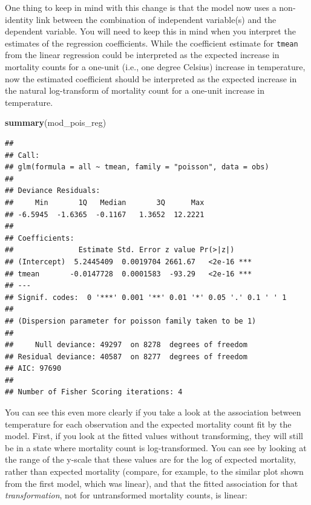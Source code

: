 \documentclass[
]{book}
\newenvironment{Shaded}{\begin{snugshade}}{\end{snugshade}}
\newcommand{\KeywordTok}[1]{\textcolor[rgb]{0.13,0.29,0.53}{\textbf{#1}}}
\newcommand{\NormalTok}[1]{#1}
\begin{document}
One thing to keep in mind with this change is that the model now uses a
non-identity link between the combination of independent variable(s) and the
dependent variable. You will need to keep this in mind when you interpret
the estimates of the regression coefficients. While the coefficient estimate
for \texttt{tmean} from the linear regression could be interpreted as the expected
increase in mortality counts for a one-unit (i.e., one degree Celsius) increase
in temperature, now the estimated coefficient should be interpreted as the
expected increase in the natural log-transform of mortality count for a one-unit
increase in temperature.

\begin{Shaded}
\begin{Highlighting}[]
\KeywordTok{summary}\NormalTok{(mod_pois_reg)}
\end{Highlighting}
\end{Shaded}

\begin{verbatim}
## 
## Call:
## glm(formula = all ~ tmean, family = "poisson", data = obs)
## 
## Deviance Residuals: 
##     Min       1Q   Median       3Q      Max  
## -6.5945  -1.6365  -0.1167   1.3652  12.2221  
## 
## Coefficients:
##               Estimate Std. Error z value Pr(>|z|)    
## (Intercept)  5.2445409  0.0019704 2661.67   <2e-16 ***
## tmean       -0.0147728  0.0001583  -93.29   <2e-16 ***
## ---
## Signif. codes:  0 '***' 0.001 '**' 0.01 '*' 0.05 '.' 0.1 ' ' 1
## 
## (Dispersion parameter for poisson family taken to be 1)
## 
##     Null deviance: 49297  on 8278  degrees of freedom
## Residual deviance: 40587  on 8277  degrees of freedom
## AIC: 97690
## 
## Number of Fisher Scoring iterations: 4
\end{verbatim}

You can see this even more clearly if you take a look at the association between
temperature for each observation and the expected mortality count fit by the
model. First, if you look at the fitted values without transforming, they
will still be in a state where mortality count is log-transformed. You can
see by looking at the range of the y-scale that these values are for the log
of expected mortality, rather than expected mortality (compare, for example, to
the similar plot shown from the first model, which was linear), and that the fitted
association for that \emph{transformation}, not for untransformed mortality counts, is linear:
\end{document}

